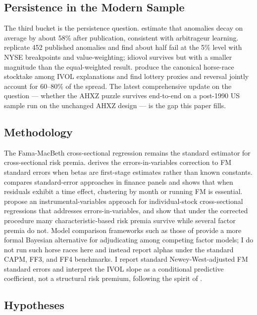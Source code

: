 \documentclass[12pt]{article}
\newcommand{\1}[1]{\mathds{1}\left[#1\right]}
\begin{document}
\subsection{Persistence in the Modern Sample}

The third bucket is the persistence question. \citet{mclean2016does} estimate
that anomalies decay on average by about 58\% after publication, consistent
with arbitrageur learning. \citet{hou2020replicating} replicate 452 published
anomalies and find about half fail at the 5\% level with NYSE breakpoints and
value-weighting; idiovol survives but with a smaller magnitude than the
equal-weighted result. \citet{hou2016have} produce the canonical horse-race
stocktake among IVOL explanations and find lottery proxies and reversal
jointly account for 60--80\% of the spread. The latest comprehensive update
on the question --- whether the AHXZ puzzle survives end-to-end on a
post-1990 US sample run on the unchanged AHXZ design --- is the gap this
paper fills.

\subsection{Methodology}

The Fama-MacBeth cross-sectional regression \citep{famamacbeth1973} remains
the standard estimator for cross-sectional risk premia.
\citet{shanken1992estimation} derives the errors-in-variables correction to
FM standard errors when betas are first-stage estimates rather than known
constants. \citet{petersen2009estimating} compares standard-error approaches
in finance panels and shows that when residuals exhibit a time effect,
clustering by month or running FM is essential.
\citet{jegadeesh2019empirical} propose an instrumental-variables approach
for individual-stock cross-sectional regressions that addresses
errors-in-variables, and show that under the corrected procedure many
characteristic-based risk premia survive while several factor premia do not.
Model comparison frameworks such as those of \citet{barillas2018comparing}
provide a more formal Bayesian alternative for adjudicating among competing
factor models; I do not run such horse races here and instead report alphas
under the standard CAPM, FF3, and FF4 benchmarks. I report standard
Newey-West-adjusted FM standard errors and interpret the IVOL slope as a
conditional predictive coefficient, not a structural risk premium, following
the spirit of \citet{jegadeesh2019empirical}.

\subsection{Hypotheses}
\end{document}

